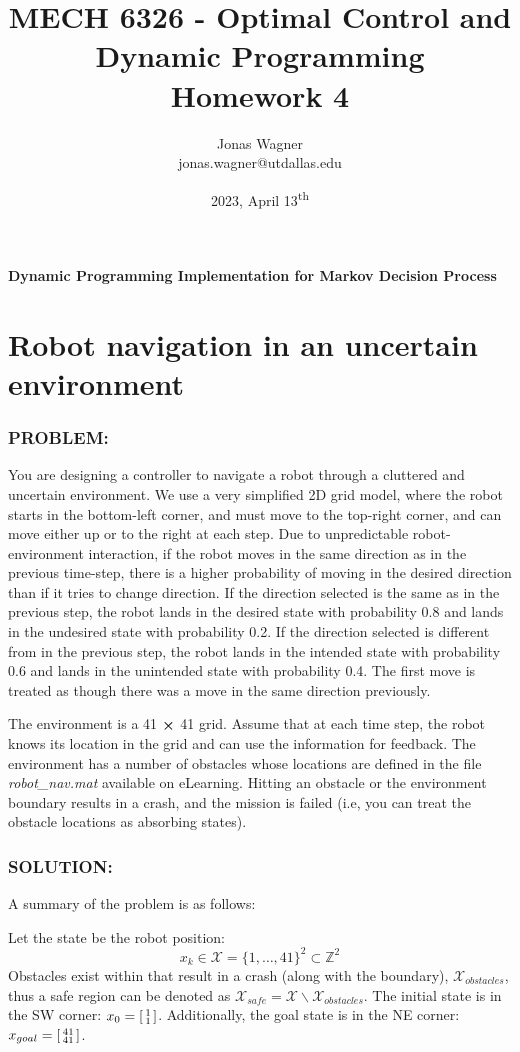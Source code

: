 \documentclass[]{article}
\title{
    MECH 6326 - Optimal Control and Dynamic Programming \\ 
    Homework 4
}
\author{Jonas Wagner\\ jonas.wagner@utdallas.edu}
\date{2023, April 13\textsuperscript{th}}
\newcommand{\Problem}{\subsubsection*{\textbf{PROBLEM:}}}
\newcommand{\Solution}{\subsubsection*{\textbf{SOLUTION:}}}
\newcommand{\Z}{\mathbb{Z}}
\begin{document}
\maketitle

\tableofcontents

\newpage
\textbf{Dynamic Programming Implementation for Markov Decision Process}
\section{Robot navigation in an uncertain environment} 
\Problem
You are designing a controller to navigate a robot through a cluttered and uncertain environment. 
We use a very simplified 2D grid model, where the robot starts in the bottom-left corner, and must move to the top-right corner, and can move either up or to the right at each step.
Due to unpredictable robot-environment interaction, if the robot moves in the same direction as in the previous time-step, there is a higher probability of moving in the desired direction than if it tries to change direction. 
If the direction selected is the same as in the previous step, the robot lands in the desired state with probability 0.8 and lands in the undesired state with probability 0.2. 
If the direction selected is different from in the previous step, the robot lands in the intended state with probability 0.6 and lands in the unintended state with probability 0.4. 
The first move is treated as though there was a move in the same direction previously.

The environment is a 41 $\cross$ 41 grid. Assume that at each time step, the robot knows its location in the grid and can use the information for feedback. 
The environment has a number of obstacles whose locations are defined in the file \emph{robot\_nav.mat} available on eLearning. 
Hitting an obstacle or the environment boundary results in a crash, and the mission is failed (i.e, you can treat the obstacle locations as absorbing states).

\Solution
A summary of the problem is as follows:

Let the state be the robot position: \[
    x_k \in \mathcal{X} = \{1,\dots,41\}^2 \subset \Z^2
\]
Obstacles exist within that result in a crash (along with the boundary), $\mathcal{X}_{obstacles}$, thus a safe region can be denoted as $\mathcal{X}_{safe} = \mathcal{X} \backslash \mathcal{X}_{obstacles}$.
The initial state is in the SW corner: $x_{0} = \smqty[1\\1]$.
Additionally, the goal state is in the NE corner: $x_{goal} = \smqty[41\\41]$.
\end{document}
